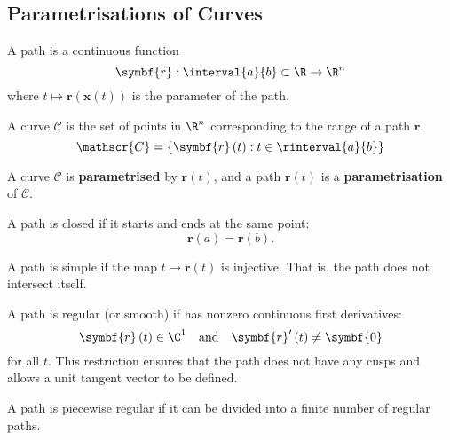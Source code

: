 \documentclass{article}
\begin{document}
\subsection{Parametrisations of Curves}
\begin{definition}[Path]
    A path is a continuous function
    \begin{equation*}
        \symbf{r} : \interval{a}{b} \subset \R \to \R^n
    \end{equation*}
    where \(t \mapsto \symbf{r}\left( \symbf{x}\left( t \right) \right)\)
    is the parameter of the path.
\end{definition}
\begin{definition}[Curve]
    A curve \(\mathscr{C}\) is the set of points in \(\R^n\)
    corresponding to the range of a path \(\symbf{r}\).
    \begin{equation*}
        \mathscr{C} = \left\{ \symbf{r}\left( t \right) : t \in \rinterval{a}{b} \right\}
    \end{equation*}
\end{definition}
A curve \(\mathscr{C}\) is \textbf{parametrised} by \(\symbf{r}\left( t \right)\),
and a path \(\symbf{r}\left( t \right)\) is a \textbf{parametrisation}
of \(\mathscr{C}\).
\begin{definition}
    A path is closed if it starts and ends at the same point:
    \begin{equation*}
        \symbf{r}\left( a \right) = \symbf{r}\left( b \right).
    \end{equation*}
\end{definition}
\begin{definition}
    A path is simple if the map \(t \mapsto \symbf{r}\left( t \right)\)
    is injective. That is, the path does not intersect itself.
\end{definition}
\begin{definition}
    A path is regular (or smooth) if has nonzero continuous first derivatives:
    \begin{equation*}
        \symbf{r}\left( t \right) \in \C^1 \quad \text{and} \quad
        \symbf{r}'\left( t \right) \neq \symbf{0}
    \end{equation*}
    for all \(t\). This restriction ensures that the path does not have
    any cusps and allows a unit tangent vector to be defined.
\end{definition}
\begin{definition}
    A path is piecewise regular if it can be divided into a finite
    number of regular paths.
\end{definition}
\end{document}
